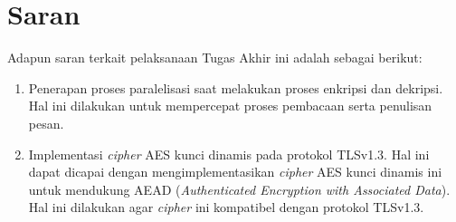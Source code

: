 \section{Saran}
Adapun saran terkait pelaksanaan Tugas Akhir ini adalah sebagai berikut:
\begin{enumerate}
  \item Penerapan proses paralelisasi saat melakukan proses enkripsi dan dekripsi. Hal ini dilakukan untuk mempercepat proses pembacaan serta penulisan pesan.
  \item Implementasi \emph{cipher} AES kunci dinamis pada protokol TLSv1.3. Hal ini dapat dicapai dengan mengimplementasikan \emph{cipher} AES kunci dinamis ini untuk mendukung AEAD (\emph{Authenticated Encryption with Associated Data}). Hal ini dilakukan agar \emph{cipher} ini kompatibel dengan protokol TLSv1.3.
\end{enumerate}

